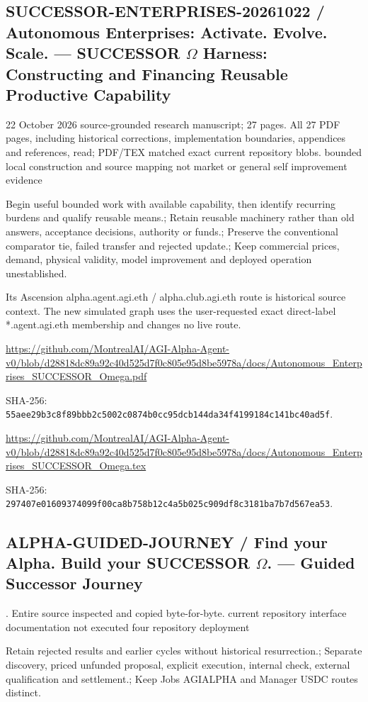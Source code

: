 \documentclass[10pt]{article}
\begin{document}
\subsection*{SUCCESSOR-ENTERPRISES-20261022 / Autonomous Enterprises: Activate. Evolve. Scale. --- SUCCESSOR $\Omega$ Harness: Constructing and Financing Reusable Productive Capability}

22 October 2026 source-grounded research manuscript; 27 pages. All 27 PDF pages, including historical corrections, implementation boundaries, appendices and references, read; PDF/TEX matched exact current repository blobs. bounded local construction and source mapping not market or general self improvement evidence

Begin useful bounded work with available capability, then identify recurring burdens and qualify reusable means.; Retain reusable machinery rather than old answers, acceptance decisions, authority or funds.; Preserve the conventional comparator tie, failed transfer and rejected update.; Keep commercial prices, demand, physical validity, model improvement and deployed operation unestablished.

Its Ascension alpha.agent.agi.eth / alpha.club.agi.eth route is historical source context. The new simulated graph uses the user-requested exact direct-label *.agent.agi.eth membership and changes no live route.

\url{https://github.com/MontrealAI/AGI-Alpha-Agent-v0/blob/d28818dc89a92c40d525d7f0c805e95d8be5978a/docs/Autonomous_Enterprises_SUCCESSOR_Omega.pdf}\par SHA-256: \nolinkurl{55aee29b3c8f89bbb2c5002c0874b0cc95dcb144da34f4199184c141bc40ad5f}.

\url{https://github.com/MontrealAI/AGI-Alpha-Agent-v0/blob/d28818dc89a92c40d525d7f0c805e95d8be5978a/docs/Autonomous_Enterprises_SUCCESSOR_Omega.tex}\par SHA-256: \nolinkurl{297407e01609374099f00ca8b758b12c4a5b025c909df8c3181ba7b7d567ea53}.

\subsection*{ALPHA-GUIDED-JOURNEY / Find your Alpha. Build your SUCCESSOR $\Omega$. --- Guided Successor Journey}

. Entire source inspected and copied byte-for-byte. current repository interface documentation not executed four repository deployment

Retain rejected results and earlier cycles without historical resurrection.; Separate discovery, priced unfunded proposal, explicit execution, internal check, external qualification and settlement.; Keep Jobs AGIALPHA and Manager USDC routes distinct.
\end{document}

